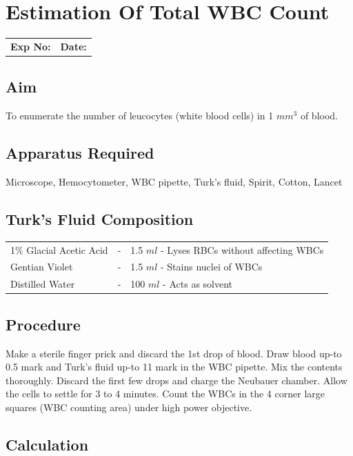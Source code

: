 \documentclass[a4paper,12pt,openany,oneside]{book}
\begin{document}
					\chapter*{\centering Estimation Of Total WBC Count}

					\begin{tabular}{p{4.5in} p{1in}}
						\textbf{Exp No:}  & \textbf{Date:}\\
					\end{tabular}
					\section *{Aim}
					To enumerate the number of leucocytes (white blood cells) in 1 $mm^3$ of blood.
					\section*{Apparatus Required}
					Microscope, Hemocytometer, WBC pipette, Turk’s fluid, Spirit, Cotton, Lancet
					\section*{Turk's Fluid Composition}
					\begin{tabular}{l c l}

						1\% Glacial Acetic Acid	&	-&	1.5 $ml$ - Lyses RBCs without affecting WBCs\\
						Gentian Violet&			-&	1.5 $ml$ - Stains nuclei of WBCs\\
						Distilled Water&		-&	100 $ml$ - Acts as solvent\\

					\end{tabular}
					\section*{Procedure}

					Make a sterile finger prick and discard the 1st drop of blood. Draw blood up-to 0.5 mark and Turk’s fluid up-to 11 mark in the WBC pipette. Mix the contents thoroughly. Discard the first few drops and charge the Neubauer chamber. Allow the cells to settle for 3 to 4 minutes. Count the WBCs in the 4 corner large squares (WBC counting area) under high power objective.

					\section*{Calculation}
\end{document}
